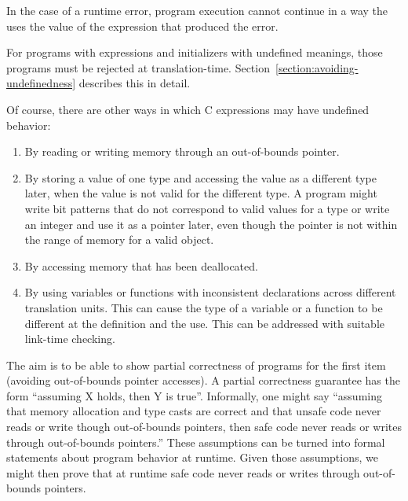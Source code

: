 In the case of a runtime error, program execution cannot continue in a
way the uses the value of the expression that produced the error.

For programs with expressions and initializers with undefined meanings,
those programs must be rejected at translation-time. 
Section~\ref{section:avoiding-undefinedness}
describes this in detail.

Of course, there are other ways in which C expressions may have
undefined behavior:

\begin{enumerate}
\item
  By reading or writing memory through an out-of-bounds pointer.
\item
  By storing a value of one type and accessing the value as a different
  type later, when the value is not valid for the different type. A
  program might write bit patterns that do not correspond to valid
  values for a type or write an integer and use it as a pointer later,
  even though the pointer is not within the range of memory for a valid
  object.
\item
  By accessing memory that has been deallocated.
\item
  By using variables or functions with inconsistent declarations across
  different translation units. This can cause the type of a variable or
  a function to be different at the definition and the use. This can be
  addressed with suitable link-time checking.
\end{enumerate}

The aim is to be able to show partial correctness of programs for the
first item (avoiding out-of-bounds pointer accesses). A
partial correctness guarantee has the form ``assuming X holds, then Y is
true''. Informally, one might say ``assuming that memory allocation and
type casts are correct and that unsafe code never reads or write though
out-of-bounds pointers, then safe code never reads or writes through
out-of-bounds pointers.'' These assumptions can be turned into formal
statements about program behavior at runtime. Given those assumptions,
we might then prove that at runtime safe code never reads or writes
through out-of-bounds pointers.
